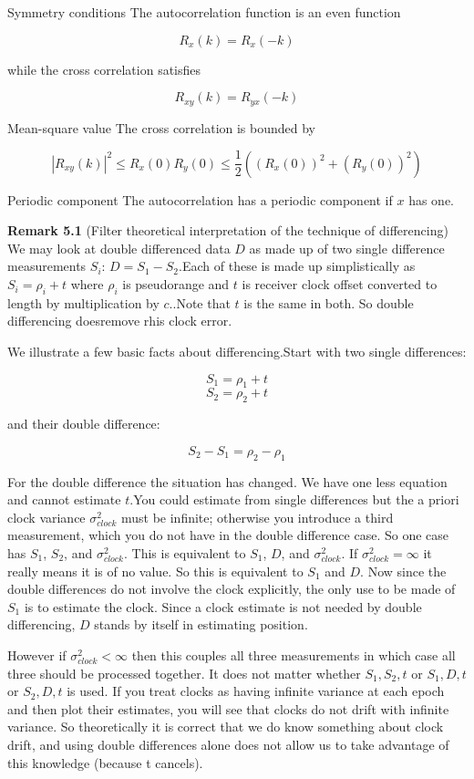  Symmetry conditions The autocorrelation function is an even function 
 
 \[ R_{x}(k) = R_{x}(-k) \]
 
 while the cross correlation satisfies 
 
 \[ R_{xy}(k)=R_{yx}(-k) \]
 
 Mean-square value The cross correlation is bounded by
 
 \[ |R_{xy}(k)|^{2}\leq R_{x}(0)R_{y}(0)\leq\frac{1}{2}((R_{x}(0))^{2}+(R_{y}(0))^{2}) \]
 
 Periodic component The autocorrelation has a periodic component if $  x $ has one.
 
  \textbf{Remark 5.1} (Filter theoretical interpretation of the technique of differencing) We may look at double differenced data $ D $ as made up of two single difference measurements $ S_{i} $: $ D=S_{1}-S_{2} $.Each of these is made up simplistically as $ S_{i}=\rho_{i}+t $ where $ \rho_{i} $ is pseudorange and $ t $ is receiver clock offset converted to length by multiplication by $ c $..Note that $ t $ is the same in both. So double differencing doesremove rhis clock error. 
  
  We illustrate a few basic facts about differencing.Start with two single differences: 
  
  \[ S_{1}=\rho_{1}+t \]
  \[ S_{2}=\rho_{2}+t \]
  
  and their double difference:
  
  \[ S_{2}-S_{1}=\rho_{2}-\rho_{1} \]
  
  For the double difference the situation has changed. We have one less equation and cannot estimate $ t $.You could estimate from single differences but the a priori clock variance $ \sigma_{clock}^{2} $ must be infinite; otherwise you introduce a third measurement, which you do not have in the double difference case. So one case has $ S_{1} $, $ S_{2} $, and $ \sigma_{clock}^{2} $. This is equivalent to $ S_{1} $, $ D $, and  $ \sigma_{clock}^{2} $. If  $ \sigma_{clock}^{2} = \infty $ it really means it is of no value. So this is equivalent to $ S_{1} $ and $ D $. Now since the double differences do not involve the clock explicitly, the only use to be made of $ S_{1} $ is to estimate the clock. Since a clock estimate is not needed by double differencing, $ D $ stands by itself in estimating position. 
  
  However if $ \sigma_{clock}^{2}<\infty $ then this couples all three measurements in which case all three should be processed together. It does not matter whether $S_{1},S_{2},t  $ or $ S_{1},D,t $ or $ S_{2},D,t $ is used. If you treat clocks as having infinite variance at each epoch and then plot their estimates, you will see that clocks do not drift with infinite variance. So theoretically it is correct that we do know something about clock drift, and using double differences alone does not allow us to take advantage of this knowledge (because t cancels). 
  
